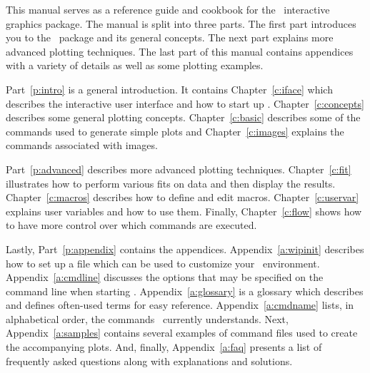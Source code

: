 %
%

This manual serves as a reference guide and cookbook for the
\wip\ interactive graphics package.
The manual is split into three parts.
The first part introduces you to
the \wip\ package and its general concepts.
The next part explains more advanced plotting techniques.
The last part of this manual
contains appendices with a variety of details
as well as some plotting examples.

Part~\ref{p:intro} is a general introduction.
It contains
Chapter~\ref{c:iface} which describes
the interactive user interface and how to start up \wip.
Chapter~\ref{c:concepts}
describes some general plotting concepts.
Chapter~\ref{c:basic} describes some of the commands used to
generate simple plots and Chapter~\ref{c:images}
explains the commands associated with images.

Part~\ref{p:advanced} describes
more advanced plotting techniques.
Chapter~\ref{c:fit}
illustrates how to perform various fits on data and then display the results.
Chapter~\ref{c:macros}
describes how to define and edit macros.
Chapter~\ref{c:uservar}
explains user variables
and how to use them.
Finally, Chapter~\ref{c:flow}
shows how to have more control over which
commands are executed.

Lastly, Part~\ref{p:appendix} contains the appendices.
Appendix~\ref{a:wipinit} describes how to set up a file which
can be used to customize your \wip\ environment.
Appendix~\ref{a:cmdline} discusses the
options that may be specified on the command line
when starting \wip.
Appendix~\ref{a:glossary} is a glossary which 
describes and defines often-used terms for easy reference.
Appendix~\ref{a:cmdname} lists, in alphabetical order,
the commands \wip\ currently understands.
Next, Appendix~\ref{a:samples} contains
several examples of command files used to create the
accompanying plots.
And, finally, Appendix~\ref{a:faq} presents a list of frequently asked
questions along with explanations and solutions.

